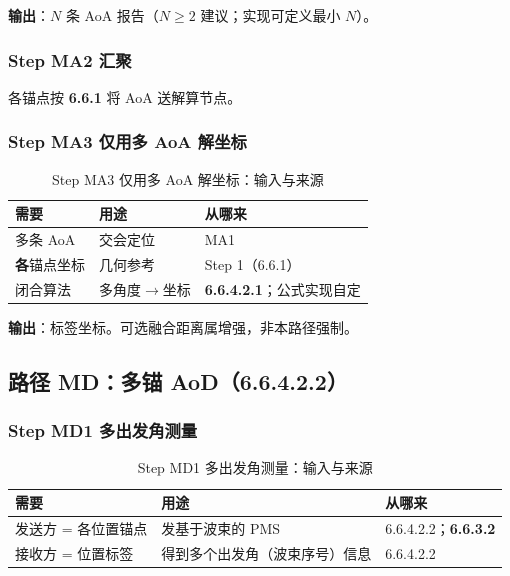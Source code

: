 \documentclass[11pt,a4paper]{ctexart}
\begin{document}
\textbf{输出}：$N$ 条 AoA 报告（$N\ge 2$ 建议；实现可定义最小 $N$）。

\subsubsection{Step MA2 汇聚}

各锚点按 \textbf{6.6.1} 将 AoA 送解算节点。

\subsubsection{Step MA3 仅用多 AoA 解坐标}

\begin{longtable}{L{3.4cm}L{4.8cm}L{4.8cm}}
\caption{Step MA3 仅用多 AoA 解坐标：输入与来源\label{tab:step130}} \\
\toprule
\textbf{需要} & \textbf{用途} & \textbf{从哪来} \\
\midrule
多条 AoA & 交会定位 & MA1 \\
\textbf{各}锚点坐标 & 几何参考 & Step 1（6.6.1） \\
闭合算法 & 多角度$\rightarrow$坐标 & \textbf{6.6.4.2.1}；公式实现自定 \\
\bottomrule
\end{longtable}

\textbf{输出}：标签坐标。可选融合距离属增强，非本路径强制。

\subsection{路径 MD：多锚 AoD（6.6.4.2.2）}
\label{sec:md}

\subsubsection{Step MD1 多出发角测量}

\begin{longtable}{L{3.4cm}L{4.8cm}L{4.8cm}}
\caption{Step MD1 多出发角测量：输入与来源\label{tab:step131}} \\
\toprule
\textbf{需要} & \textbf{用途} & \textbf{从哪来} \\
\midrule
发送方 = 各位置锚点 & 发基于波束的 PMS & 6.6.4.2.2；\textbf{6.6.3.2} \\
接收方 = 位置标签 & 得到多个出发角（波束序号）信息 & 6.6.4.2.2 \\
\bottomrule
\end{longtable}
\end{document}
